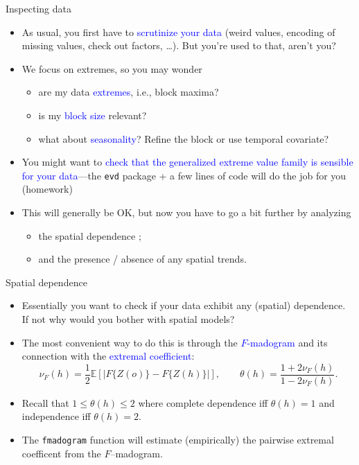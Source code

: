 \documentclass[blackslide,style=simple]{powerdot}
\theoremstyle{plain}%
\theoremstyle{definition}
\theoremstyle{remark}
\begin{document}
\begin{slide}[toc=First look]{Inspecting data}
  \begin{itemize}
  \item As usual, you first have to \textcolor{blue}{scrutinize your
      data} (weird values, encoding of missing values, check out
    factors, \ldots). But you're used to that, aren't you?
  \item We focus on extremes, so you may wonder
    \begin{itemize}
    \item are my data \textcolor{blue}{extremes}, i.e., block maxima?
    \item is my \textcolor{blue}{block size} relevant?
    \item what about \textcolor{blue}{seasonality}? Refine the block
      or use temporal covariate?
    \end{itemize}
  \item You might want to \textcolor{blue}{check that the generalized
      extreme value family is sensible for your data}---the
    \texttt{evd} package + a few lines of code will do the job for you
    (homework)
  \item This will generally be OK, but now you have to go a bit
    further by analyzing
    \begin{itemize}
    \item the spatial dependence ;
    \item and the presence / absence of any spatial trends.
    \end{itemize}
  \end{itemize}
\end{slide}

\begin{slide}{Spatial dependence}
  \begin{itemize}
  \item Essentially you want to check if your data exhibit any
    (spatial) dependence. If not why would you bother with spatial
    models?
  \item The most convenient way to do this is through the
    \textcolor{blue}{$F$-madogram} and its connection with the
    \textcolor{blue}{extremal coefficient}:
    \begin{equation*}
      \nu_F(h) = \frac{1}{2} \mathbb{E} [| F\{Z(o)\} - F\{Z(h)\}| ],
      \qquad \theta(h) = \frac{1 + 2 \nu_F(h)}{1 - 2 \nu_F(h)}.
    \end{equation*}
  \item Recall that $1 \leq \theta(h) \leq 2$ where complete
    dependence iff $\theta(h) = 1$ and independence iff $\theta(h) =
    2$.
  \item The \texttt{fmadogram} function will estimate (empirically)
    the pairwise extremal coefficent from the $F$--madogram.
  \end{itemize}
\end{slide}
\end{document}
